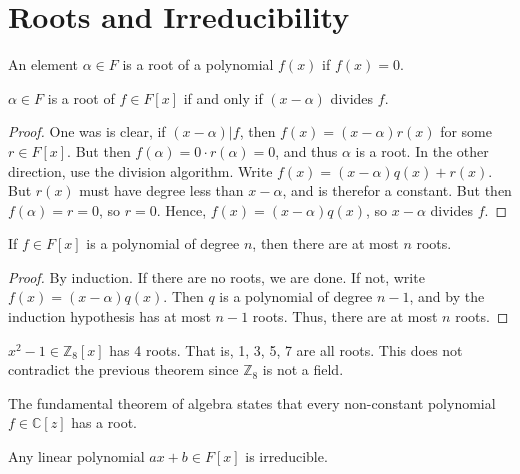 \documentclass{article}                                                        %
\begin{document}
    \section{Roots and Irreducibility}
        \begin{definition}
            An element $\alpha\in{F}$ is a root of a polynomial $f(x)$ if
            $f(x)=0$.
        \end{definition}
        \begin{theorem}
            $\alpha\in{F}$ is a root of $f\in{F}[x]$ if and only if
            $(x-\alpha)$ divides $f$.
        \end{theorem}
        \begin{proof}
            One was is clear, if $(x-\alpha)|f$, then $f(x)=(x-\alpha)r(x)$ for
            some $r\in{F}[x]$. But then $f(\alpha)=0\cdot{r}(\alpha)=0$, and
            thus $\alpha$ is a root. In the other direction, use the division
            algorithm. Write $f(x)=(x-\alpha)q(x)+r(x)$. But $r(x)$ must have
            degree less than $x-\alpha$, and is therefor a constant. But then
            $f(\alpha)=r=0$, so $r=0$. Hence, $f(x)=(x-\alpha)q(x)$, so
            $x-\alpha$ divides $f$.
        \end{proof}
        \begin{theorem}
            If $f\in{F}[x]$ is a polynomial of degree $n$, then there are at
            most $n$ roots.
        \end{theorem}
        \begin{proof}
            By induction. If there are no roots, we are done. If not, write
            $f(x)=(x-\alpha)q(x)$. Then $q$ is a polynomial of degree $n-1$, and
            by the induction hypothesis has at most $n-1$ roots. Thus, there are
            at most $n$ roots.
        \end{proof}
        \begin{example}
            $x^{2}-1\in\mathbb{Z}_{8}[x]$ has 4 roots. That is, 1, 3, 5, 7
            are all roots. This does not contradict the previous theorem since
            $\mathbb{Z}_{8}$ is not a field.
        \end{example}
        \begin{theorem}
            The fundamental theorem of algebra states that every non-constant
            polynomial $f\in\mathbb{C}[z]$ has a root.
        \end{theorem}
        \begin{theorem}
            Any linear polynomial $ax+b\in{F}[x]$ is irreducible.
        \end{theorem}
\end{document}
